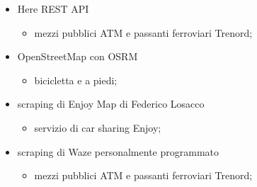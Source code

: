 \begin{itemize}
	\item Here REST API\cite{hereapi}
	\begin{itemize}
		\item mezzi pubblici ATM e passanti ferroviari Trenord;
	\end{itemize}

	\item OpenStreetMap con OSRM\cite{osm}
	\begin{itemize}
		\item bicicletta e a piedi;
	\end{itemize}

	\item scraping di Enjoy Map di Federico Losacco\cite{enjoycarsharing}\cite{losaccofederico}
	\begin{itemize}
		\item servizio di car sharing Enjoy;
	\end{itemize}

	\item scraping di Waze personalmente programmato\cite{hereapi}
	\begin{itemize}
		\item mezzi pubblici ATM e passanti ferroviari Trenord;
	\end{itemize}
\end{itemize}

